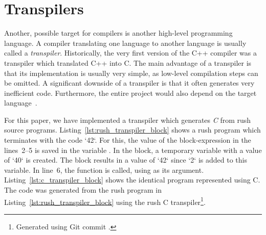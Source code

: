 \section{Transpilers}

Another, possible target for compilers is another high-level programming language.
A compiler translating one language to another language is usually called a \emph{transpiler}.
Historically, the very first version of the C++ compiler was a transpiler which translated C++ into C.
The main advantage of a transpiler is that its implementation is usually very simple, as low-level compilation steps can be omitted.
A significant downside of a transpiler is that it often generates very inefficient code.
Furthermore, the entire project would also depend on the target language~\cite[p.~5]{Jeffery2021}.

For this paper, we have implemented a transpiler which generates \emph{C} from rush source programs.
Listing~\ref{lst:rush_transpiler_block} shows a rush program which terminates with the code `42`.
For this, the value of the block-expression in the lines~2--5 is saved in the variable .
In the block, a temporary variable with a value of `40` is created.
The block results in a value of `42` since `2` is added to this variable.
In line~6, the  function is called, using  as its argument.
Listing~\ref{lst:c_transpiler_block} shows the identical program represented using C.
The code was generated from the rush program in Listing~\ref{lst:rush_transpiler_block} using the rush C transpiler\footnote{Generated using Git commit \rushCommit{}.}.

\begin{minipage}{.34\textwidth}
	\center
\end{minipage}%
\hspace{3cm}%
\begin{minipage}{.45\textwidth}
	\center
	\vspace{.1cm}
\end{minipage}

